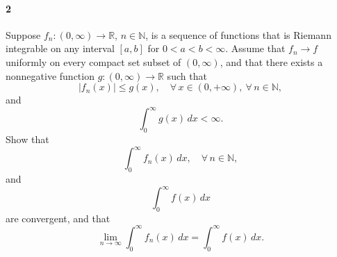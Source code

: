 \documentclass[12pt]{article}
\newenvironment{fullbox}{\begin{lrbox}{\savefullbox}\begin{minipage}{\dimexpr\textwidth-2\fboxsep\relax}}{\end{minipage}\end{lrbox}\begin{center}\framebox[\textwidth]{\usebox{\savefullbox}}\end{center}}
\newenvironment{pbox}[1][]{\begin{fullbox}\ifx#1\empty\else\paragraph{#1}\fi}{\end{fullbox}}
\theoremstyle{definition}
\newcommand{\N}{\mathbb{N}}
\newcommand{\R}{\mathbb{R}}
\begin{document}
\newpage
\begin{pbox}[2]
    Suppose $f_n:(0,\infty)\to \R$, $n\in \N$, is a sequence of functions that is Riemann integrable on any interval $[a,b]$ for $0<a<b<\infty$. Assume that $f_n \to f$ uniformly on every compact set subset of $(0,\infty)$, and that there exists a nonnegative function $g:(0,\infty)\to \R$ such that 
    \begin{equation}
    |f_n(x)|\le g(x),\quad \forall\, x \in (0,+\infty),\ \forall\,n\in \N,
    \end{equation}
    and
    \begin{equation}
    \int_0^{\infty}g(x)\,dx < \infty.
    \end{equation}
    Show that 
    \begin{equation}
    \int_0^\infty f_n(x)\,dx,\quad \forall\,n\in \N,
    \end{equation}
    and
    \begin{equation}
    \int_0^\infty f(x)\,dx
    \end{equation}
    are convergent, and that 
    \begin{equation}
    \lim_{n\to \infty} \int_0^{\infty} f_n(x)\,dx = \int_0^{\infty} f(x)\,dx. 
    \end{equation}
\end{pbox}
\end{document}
